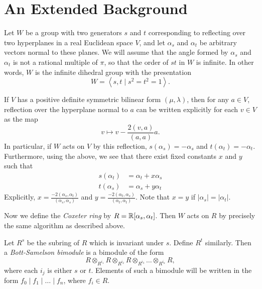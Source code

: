 %

\appendix


\section{An Extended Background}
\label{sec:prelim_background}
Let $W$ be a group with two generators $s$ and $t$ corresponding to reflecting over two hyperplanes in a real Euclidean space $V$, and let $\alpha_s$ and $\alpha_t$ be arbitrary vectors normal to these planes.  We will assume that the angle formed by $\alpha_s$ and $\alpha_t$ is not a rational multiple of $\pi$, so that the order of $st$ in $W$ is infinite.  In other words, $W$ is the infinite dihedral group with the presentation \[ W = \left<s,t \mid s^2=t^2=1\right>. \] 

If $V$ has a positive definite symmetric bilinear form $(\mu, \lambda)$, then for any $a \in V$, reflection over the hyperplane normal to $a$ can be written explicitly for each $v \in V$ as the map \[ v \mapsto v - \frac{2(v,a)}{(a,a)} a. \]  
In particular, if $W$ acts on $V$ by this reflection, $s(\alpha_s) = -\alpha_s$ and $t(\alpha_t) = -\alpha_t$.  Furthermore, using the above, we see that there exist fixed constants $x$ and $y$ such that
\begin{align*}
	s(\alpha_t) &= \alpha_t + x \alpha_s \\
	t(\alpha_s) &= \alpha_s + y \alpha_t
\end{align*}
Explicitly, $x = \frac{-2(\alpha_s,\alpha_t)}{(\alpha_s, \alpha_s)}$ and $y = \frac{-2(\alpha_t,\alpha_s)}{(\alpha_t,\alpha_t)}$.  Note that $x=y$ if $\left\lvert \alpha_s \right\rvert = \left\lvert \alpha_t \right\rvert$.

Now we define the \emph{Coxeter ring} by $R = \mathbb R[\alpha_s, \alpha_t]$.  Then $W$ acts on $R$ by precisely the same algorithm as described above.

Let $R^s$ be the subring of $R$ which is invariant under $s$.  Define $R^t$ similarly.  Then a \emph{Bott-Samelson bimodule} is a bimodule of the form
\[ R \otimes_{R^{i_1}} R \otimes_{R^{i_2}} R \otimes_{R^{i_3}} \dots \otimes_{R^{i_n}} R, \]
where each $i_j$ is either $s$ or $t$.   Elements of such a bimodule will be written in the form $f_0 \mid f_1 \mid \dots \mid f_n$, where $f_i \in R$.

